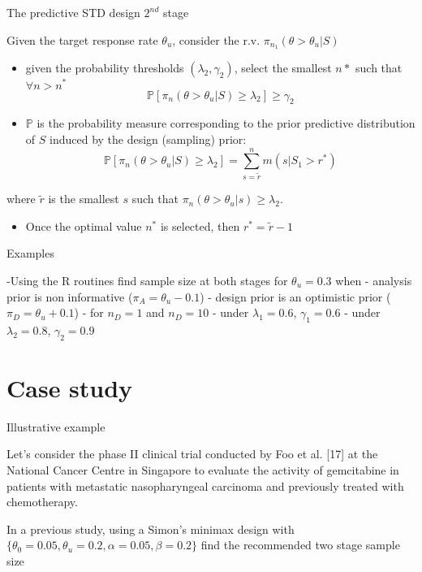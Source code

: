 \documentclass{beamer}
\begin{document}
\begin{frame}{The predictive STD design \(2^{nd}\) stage}

Given the target response rate \(\theta_u\), consider the r.v.
\(\pi_{n_1}(\theta > \theta_u \vert S)\)

\begin{itemize}
\item
  given the probability thresholds \((\lambda_2,\gamma_2)\), select the
  smallest \(n*\) such that \(\forall n>n^*\) \[
  \mathbb{P}[\pi_n(\theta >\theta_u\vert S)\geq\lambda_2]\geq\gamma_2
  \]
\item
  \(\mathbb{P}\) is the probability measure corresponding to the prior
  predictive distribution of \(S\) induced by the design (sampling)
  prior: \[
  \mathbb{P}[\pi_{n}(\theta >\theta_u\vert S)\geq\lambda_2]=\sum_{s=\tilde{r}}^{n}m(s\vert S_1>r^*)
  \]
\end{itemize}

where \(\tilde{r}\) is the smallest \(s\) such that
\(\pi_{n}(\theta >\theta_u\vert s)\geq\lambda_2\).

\begin{itemize}
\itemsep1pt\parskip0pt
\item
  Once the optimal value \(n^*\) is selected, then \(r^*=\tilde{r}-1\)
\end{itemize}

\end{frame}


\begin{frame}{Examples}

-Using the R routines find sample size at both stages for
\(\theta_u=0.3\) when - analysis prior is non informative
(\(\pi_A=\theta_u-0.1\)) - design prior is an optimistic prior
(\(\pi_D=\theta_u+0.1\)) - for \(n_D=1\) and \(n_D=10\) - under
\(\lambda_1=0.6\), \(\gamma_1=0.6\) - under \(\lambda_2=0.8\),
\(\gamma_2=0.9\)

\end{frame}



\section{Case study}\label{case-study}

\begin{frame}{Illustrative example}

Let's consider the phase II clinical trial conducted by Foo et al.
{[}17{]} at the National Cancer Centre in Singapore to evaluate the
activity of gemcitabine in patients with metastatic nasopharyngeal
carcinoma and previously treated with chemotherapy.

In a previous study, using a Simon's minimax design with
\(\{\theta_0=0.05, \theta_u=0.2, \alpha=0.05, \beta=0.2\}\) find the
recommended two stage sample size

\end{frame}
\end{document}
